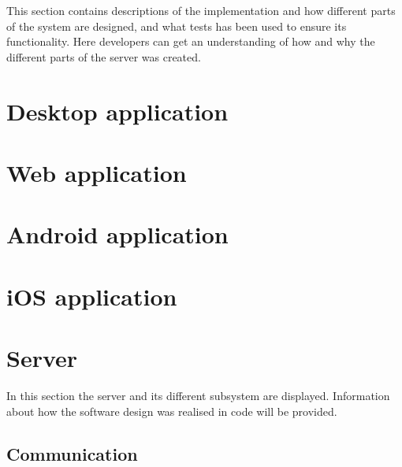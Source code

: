 
This section contains descriptions of the implementation and how different parts of the system are designed, and what tests has been used to ensure its functionality. Here developers can get an understanding of how and why the different parts of the server was created.



\section{Desktop application}

\FloatBarrier

\section{Web application}

\FloatBarrier

\section{Android application}

\FloatBarrier

\section{iOS application}

\FloatBarrier

\section{Server}

In this section the server and its different subsystem are displayed.
Information about how the software design was realised in code will be provided.

\subsection{Communication}

\FloatBarrier

